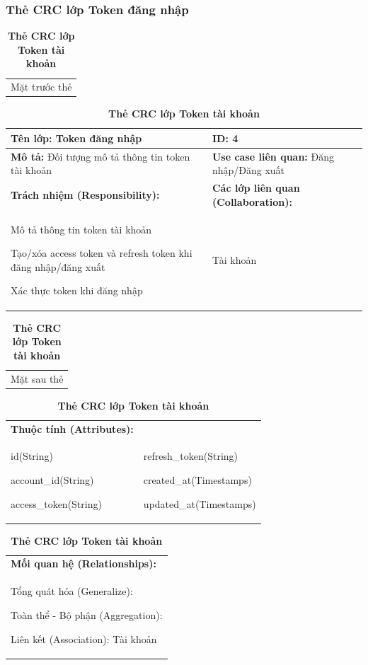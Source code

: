   \subsubsection{Thẻ CRC lớp Token đăng nhập}
  \begin{table}[H]
    \caption{\bfseries \fontsize{12pt}{0pt}\selectfont Thẻ CRC lớp Token tài khoản}
    \centering
    \begin{tabularx}{0.9\textwidth}{X}
      Mặt trước thẻ
    \end{tabularx}
    \begin{tabularx}{0.9\textwidth}{|X|X|}
      \hline
      \textbf{Tên lớp:} Token đăng nhập & \textbf{ID:} 4  \\
      \hline
      \textbf{Mô tả:} Đối tượng mô tả thông tin token tài khoản & \textbf{Use case liên quan:} Đăng nhập/Đăng xuất \\
      \hline
      \textbf{Trách nhiệm (Responsibility):} & \textbf{Các lớp liên quan (Collaboration):} \\
      Mô tả thông tin token tài khoản

      Tạo/xóa access token và refresh token khi đăng nhập/đăng xuất

      Xác thực token khi đăng nhập
      & 
      Tài khoản
      \\
      \hline
    \end{tabularx}
    \begin{tabularx}{0.9\textwidth}{X}
      Mặt sau thẻ
    \end{tabularx}
    \begin{tabularx}{0.9\textwidth}{|X|X|}
      \hline
      \textbf{Thuộc tính (Attributes):} & \\
      id(String) 
      
      account\_id(String)

      access\_token(String)
      & 
      refresh\_token(String) 
            
      created\_at(Timestamps)

      updated\_at(Timestamps)
      \\
      \hline
    \end{tabularx}
    \begin{tabularx}{0.9\textwidth}{|X|}
      \textbf{Mối quan hệ (Relationships):} \\
      Tổng quát hóa (Generalize):

      Toàn thể - Bộ phận (Aggregation):
      
      Liên kết (Association): Tài khoản
      \\
      \hline
    \end{tabularx}
  \end{table}
